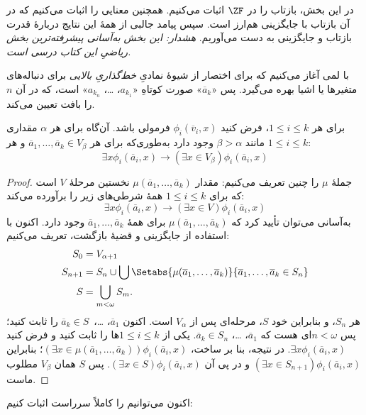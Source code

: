 \documentclass[../../../include/open-logic-section]{subfiles}
\begin{document}

در این بخش، بازتاب را در $\ZF$ اثبات می‌کنیم. همچنین معنایی را
اثبات می‌کنیم که در آن بازتاب با جایگزینی هم‌ارز است. سپس پیامد
جالبی از همهٔ این نتایج دربارهٔ قدرت بازتاب و جایگزینی به دست
می‌آوریم. \emph{هشدار: این بخش به‌آسانی پیشرفته‌ترین بخش ریاضیِ این
کتاب درسی است.}

با لمی آغاز می‌کنیم که برای اختصار از شیوهٔ نمادیِ
\emph{خط‌گذاریِ بالایی} برای دنباله‌های متغیرها یا اشیا بهره می‌گیرد.
پس «$\overline{a}_k$» صورت کوتاهِ «$a_{k_1}$، \dots،
$a_{k_n}$» است، که در آن $n$ را بافت تعیین می‌کند.

\begin{lem}
برای هر $1 \leq i \leq k$، فرض کنید
$\phi_i(\overline{v}_i, x)$ فرمولی باشد. آن‌گاه برای هر $\alpha$
مقداری مانند $\beta > \alpha$ وجود دارد به‌طوری‌که برای هر
$\overline{a}_1, \ldots, \overline{a}_k \in V_\beta$ و هر
$1 \leq i \leq k$:
\[
	\exists x\phi_i(\overline{a}_i, x) \rightarrow (\exists x \in V_\beta) \phi_i(\overline{a}_i, x)
\]
\end{lem}

\begin{proof}
جملهٔ $\mu$ را چنین تعریف می‌کنیم: مقدار
$\mu(\overline{a}_1, \ldots, \overline{a}_k)$ نخستین مرحلهٔ $V$ است
که برای $1 \leq i \leq k$ همهٔ شرطی‌های زیر را برآورده می‌کند:
\[
\exists x\phi_i(\overline{a}_i, x) \rightarrow (\exists x \in V) \phi_i(\overline{a}_i, x)
\]
به‌آسانی می‌توان تأیید کرد که
$\mu(\overline{a}_1, \ldots, \overline{a}_k)$ برای همهٔ
$\overline{a}_1, \ldots, \overline{a}_k$ وجود دارد. اکنون با استفاده
از جایگزینی و قضیهٔ بازگشت، تعریف می‌کنیم:
\begin{align*}
	S_0 & = V_{\alpha+1}\\
	S_{n+1} & = S_n \cup \bigcup
	\Setabs{\mu(\overline{a}_1, \ldots, \overline{a}_k)}
	{\overline{a}_1, \ldots, \overline{a}_k \in S_n} \\
	S &= \bigcup_{m < \omega} S_m.
\end{align*}
هر $S_n$، و بنابراین خود $S$، مرحله‌ای پس از $V_\alpha$ است. اکنون
$\overline{a}_1$، \dots،~$\overline{a}_k \in S$ را ثابت کنید؛ پس
$n < \omega$ای هست که
$\overline{a}_1$، \dots، $\overline{a}_k \in S_n$. یکی از
$1 \leq i \leq k$ها را ثابت کنید و فرض کنید
$\exists x\phi_i(\overline{a}_i,x)$. در نتیجه، بنا بر ساخت،
$(\exists x \in \mu(\overline{a}_1,
\ldots, \overline{a}_k))\phi_i(\overline{a}_i, x)$؛ بنابراین
$(\exists x \in S_{n+1})\phi_i(\overline{a}_i, x)$ و در پی آن
$(\exists x \in S)\phi_i(\overline{a}_i, x)$. پس $S$ همان
$V_\beta$ مطلوب ماست.
\end{proof}
\noindent
اکنون می‌توانیم  را
کاملاً سرراست اثبات کنیم:
\end{document}
